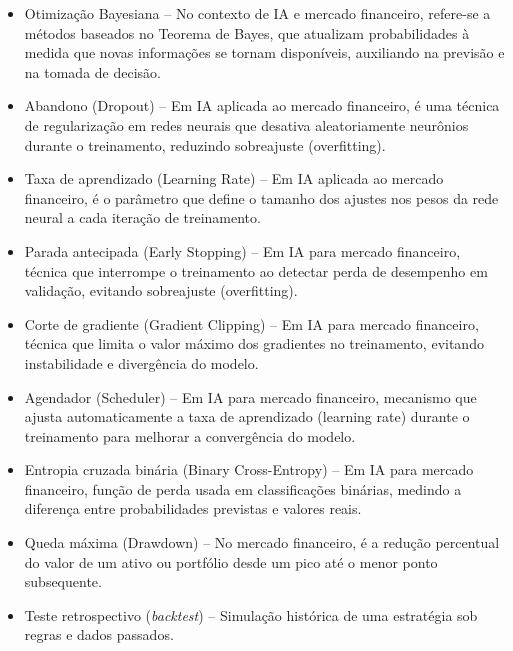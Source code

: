 \begin{itemize}
\item{Otimização Bayesiana} – No contexto de IA e mercado financeiro, refere-se a métodos baseados no Teorema de Bayes, que atualizam probabilidades à medida que novas informações se tornam disponíveis, auxiliando na previsão e na tomada de decisão.
\item{Abandono (Dropout)} – Em IA aplicada ao mercado financeiro, é uma técnica de regularização em redes neurais que desativa aleatoriamente neurônios durante o treinamento, reduzindo sobreajuste (overfitting).
\item{Taxa de aprendizado (Learning Rate)} – Em IA aplicada ao mercado financeiro, é o parâmetro que define o tamanho dos ajustes nos pesos da rede neural a cada iteração de treinamento.
\item{Parada antecipada (Early Stopping)} – Em IA para mercado financeiro, técnica que interrompe o treinamento ao detectar perda de desempenho em validação, evitando sobreajuste (overfitting).
\item{Corte de gradiente (Gradient Clipping)} – Em IA para mercado financeiro, técnica que limita o valor máximo dos gradientes no treinamento, evitando instabilidade e divergência do modelo.
\item{Agendador (Scheduler)} – Em IA para mercado financeiro, mecanismo que ajusta automaticamente a taxa de aprendizado (learning rate) durante o treinamento para melhorar a convergência do modelo.
\item{Entropia cruzada binária (Binary Cross-Entropy)} – Em IA para mercado financeiro, função de perda usada em classificações binárias, medindo a diferença entre probabilidades previstas e valores reais.
\item{Queda máxima (Drawdown)} – No mercado financeiro, é a redução percentual do valor de um ativo ou portfólio desde um pico até o menor ponto subsequente.

\item{Teste retrospectivo (\textit{backtest})} – Simulação histórica de uma estratégia sob regras e dados passados.


\end{itemize}
